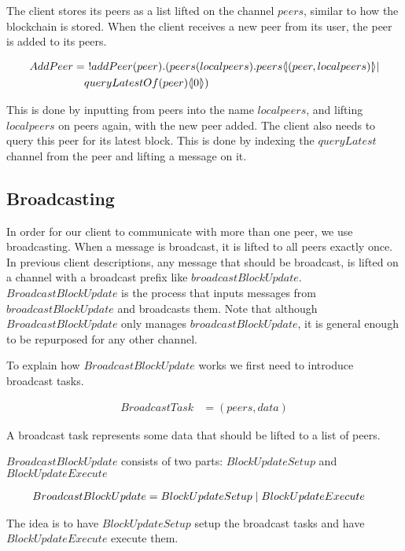 The client stores its peers as a list lifted on the channel $peers$, similar to how the blockchain is stored.
When the client receives a new peer from its user, the peer is added to its peers.

\begin{align*}
    AddPeer &=\ !addPeer(peer).(peers(localpeers).peers\lift{}{(peer,localpeers)}|\\
        &\quad queryLatestOf(peer)\lift{}{0})\\
\end{align*}

This is done by inputting from peers into the name $localpeers$, and lifting $localpeers$ on peers again, with the new peer added.
The client also needs to query this peer for its latest block.
This is done by indexing the $queryLatest$ channel from the peer and lifting a message on it.

\subsection{Broadcasting}
In order for our client to communicate with more than one peer, we use broadcasting.
When a message is broadcast, it is lifted to all peers exactly once.
In previous client descriptions, any message that should be broadcast, is lifted on a channel with a broadcast prefix like $broadcastBlockUpdate$.
$BroadcastBlockUpdate$ is the process that inputs messages from $broadcastBlockUpdate$ and broadcasts them.
Note that although $BroadcastBlockUpdate$ only manages $broadcastBlockUpdate$, it is general enough to be repurposed for any other channel.

To explain how $BroadcastBlockUpdate$ works we first need to introduce broadcast tasks.

\begin{align*}
    BroadcastTask &= (peers, data)
\end{align*}

A broadcast task represents some data that should be lifted to a list of peers.

$BroadcastBlockUpdate$ consists of two parts: $BlockUpdateSetup$ and $BlockUpdateExecute$

\begin{align*}
    BroadcastBlockUpdate &= BlockUpdateSetup \mid BlockUpdateExecute
\end{align*}

The idea is to have $BlockUpdateSetup$ setup the broadcast tasks and have $BlockUpdateExecute$ execute them.

